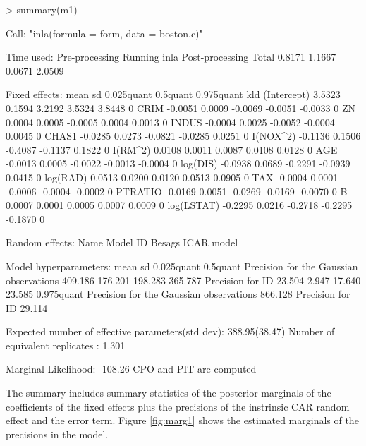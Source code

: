 \documentclass[article]{jss}
\begin{document}
\begin{Schunk}
\begin{Sinput}
> summary(m1)
\end{Sinput}
\begin{Soutput}
Call:
"inla(formula = form, data = boston.c)"

Time used:
 Pre-processing    Running inla Post-processing           Total 
         0.8171          1.1667          0.0671          2.0509 

Fixed effects:
               mean     sd 0.025quant 0.5quant 0.975quant kld
(Intercept)  3.5323 0.1594     3.2192   3.5324     3.8448   0
CRIM        -0.0051 0.0009    -0.0069  -0.0051    -0.0033   0
ZN           0.0004 0.0005    -0.0005   0.0004     0.0013   0
INDUS       -0.0004 0.0025    -0.0052  -0.0004     0.0045   0
CHAS1       -0.0285 0.0273    -0.0821  -0.0285     0.0251   0
I(NOX^2)    -0.1136 0.1506    -0.4087  -0.1137     0.1822   0
I(RM^2)      0.0108 0.0011     0.0087   0.0108     0.0128   0
AGE         -0.0013 0.0005    -0.0022  -0.0013    -0.0004   0
log(DIS)    -0.0938 0.0689    -0.2291  -0.0939     0.0415   0
log(RAD)     0.0513 0.0200     0.0120   0.0513     0.0905   0
TAX         -0.0004 0.0001    -0.0006  -0.0004    -0.0002   0
PTRATIO     -0.0169 0.0051    -0.0269  -0.0169    -0.0070   0
B            0.0007 0.0001     0.0005   0.0007     0.0009   0
log(LSTAT)  -0.2295 0.0216    -0.2718  -0.2295    -0.1870   0

Random effects:
Name	  Model
 ID   Besags ICAR model 

Model hyperparameters:
                                        mean    sd      0.025quant 0.5quant
Precision for the Gaussian observations 409.186 176.201 198.283    365.787 
Precision for ID                         23.504   2.947  17.640     23.585 
                                        0.975quant
Precision for the Gaussian observations 866.128   
Precision for ID                         29.114   

Expected number of effective parameters(std dev): 388.95(38.47)
Number of equivalent replicates : 1.301 

Marginal Likelihood:  -108.26 
CPO and PIT are computed
\end{Soutput}
\end{Schunk}
\noindent
The summary includes summary statistics of the posterior marginals of the
coefficients of the fixed effects plus the precisions of the instrinsic CAR
random effect and the error term. Figure \ref{fig:marg1} shows the estimated
marginals of the precisions in the model.
\end{document}
